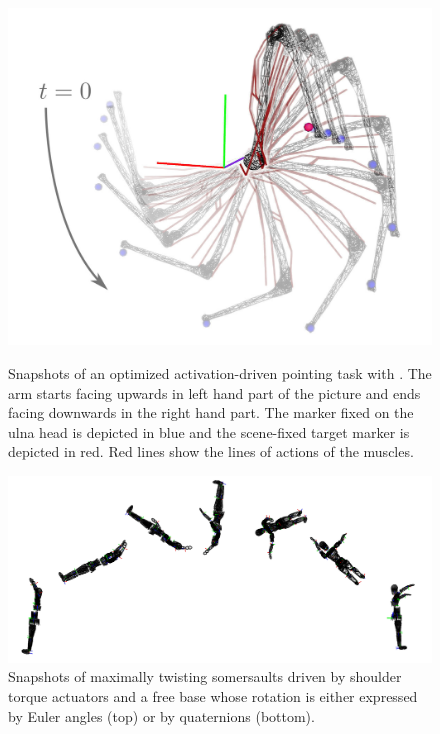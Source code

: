%
\begin{figure}[t!]
\centering
\includegraphics[width=\columnwidth]{figures/activation_pointing.jpeg}\\
\caption{Snapshots of an optimized activation-driven pointing task with \acados. The arm starts facing upwards in left hand part of the picture and ends facing downwards in the right hand part. The marker fixed on the ulna head is depicted in blue and the scene-fixed target marker is depicted in red. Red lines show the lines of actions of the muscles.}
\label{fig:snapshots_activation_driven_pointing}
\vspace*{-0.5cm}
\end{figure}
\begin{figure}[t!]
\centering
\includegraphics[width=\textwidth]{figures/Euler_Bioptim_MaxVrille_dos_7frames.png}
\caption{Snapshots of maximally twisting somersaults driven by shoulder torque actuators and a free base whose rotation is either expressed by Euler angles (top) or by quaternions (bottom).}
\label{fig:snapshots_quaternion_base_twisting_somersault}
\end{figure}
